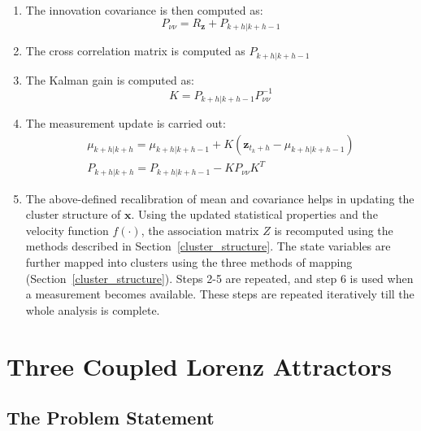 \begin{enumerate}
\begin{enumerate}
\item The innovation covariance is then computed as:
\begin{equation}
P_{\nu \nu} = R_{\textbf{z}} + P_{k+h|k+h-1}
\end{equation}
\item The cross correlation matrix is computed as $P_{k+h|k+h-1}$
\item The Kalman gain is computed as: 
\begin{equation}
K = P_{k+h|k+h-1} P_{\nu \nu}^{-1}
\end{equation}
\item The measurement update is carried out:
\begin{equation}
\begin{array}{l}
\mu_{k+h|k+h} = \mu_{k+h|k+h-1} + K(\textbf{z}_{t_k + h} - \mu_{k+h|k+h-1})  \\
P_{k+h|k+h} = P_{k+h|k+h-1} - K P_{\nu \nu} K^T
\end{array}
\end{equation}

\item The above-defined recalibration of mean and covariance helps in updating the cluster structure of $\textbf{x}$. Using the updated statistical properties and the velocity function $f(\cdot)$, the association matrix $Z$ is recomputed using the methods described in Section~\ref{cluster_structure}. The state variables are further mapped into clusters using the three methods of mapping (Section~\ref{cluster_structure}). Steps 2-5 are repeated, and step 6 is used when a measurement becomes available. These steps are repeated iteratively till the whole analysis is complete.
\end{enumerate}


\end{enumerate}

\section{Three Coupled Lorenz Attractors}
\label{three_osc}
\subsection{The Problem Statement}

